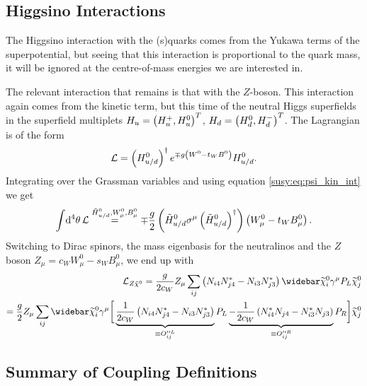 \documentclass[../main.tex]{subfiles}
\begin{document}
\subsection{Higgsino Interactions}
The Higgsino interaction with the (s)quarks comes from the Yukawa terms of the
superpotential, but seeing that this interaction is proportional to the quark
mass, it will be ignored at the centre-of-mass energies we are interested in.

The relevant interaction that remains is that with the \(Z\)-boson. This
interaction again comes from the kinetic term, but this time of the neutral
Higgs superfields in the superfield multiplets \(H_u = \left(H_u^+,
  H_u^0\right)^T\), \(H_d = \left(H_d^0, H_d^-\right)^T\). The Lagrangian is of the form
\begin{equation}
  \mathcal{L} = \left(H_{u/d}^0\right)^\dagger e^{\mp g\left(W^0 - t_W B^0\right)} H_{u/d}^0.
\end{equation}
Integrating over the Grassman variables and using equation \cref{susy:eq:psi_kin_int} we get
\begin{equation}
  \int \!\mathrm{d}^4\theta\, \mathcal{L} \stackrel{\tilde{H}_{u/d}^0, W^0_\mu, B^0_\mu}{=} \mp \frac{g}{2} \left(\tilde{H}_{u/d}^0 \sigma^\mu \left(\tilde{H}_{u/d}^0\right)^\dagger\right)\left(W^0_\mu - t_W B_\mu^0\right).
\end{equation}
Switching to Dirac spinors, the mass eigenbasis for the neutralinos and the \(Z\) boson \(Z_\mu = c_W W^0_\mu - s_W B^0_\mu\), we end up with
\begin{align}
  \nonumber
  \L_{Z \tilde{\chi}^0} = \frac{g}{2c_W} Z_\mu \sum_{ij}\pclosed{N_{i4}N_{j4}^\ast - N_{i3}N_{j3}^\ast} \barnino[i] \gamma^\mu P_L \nino[j] \\
  = \frac{g}{2} Z_\mu \sum_{ij}\barnino[i] \gamma^\mu \bigg[ \underbrace{\frac{1}{2c_W}\pclosed{N_{i4}N_{j4}^\ast - N_{i3}N_{j3}^\ast}}_{\equiv O^{\prime\prime L}_{ij}} P_L \underbrace{-\frac{1}{2c_W}\pclosed{N_{i4}^\ast N_{j4} - N_{i3}^\ast N_{j3}}}_{\equiv O^{\prime\prime R}_{ij}} P_R \bigg] \nino[j]
\end{align}




\subsection{Summary of Coupling Definitions}
\end{document}
